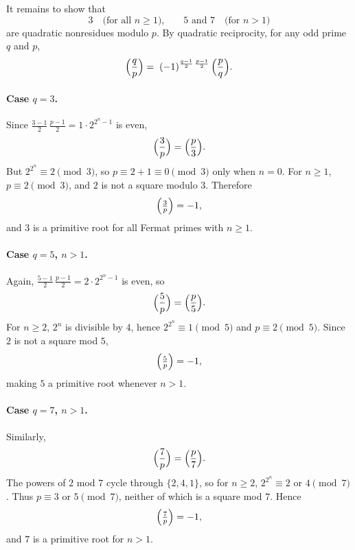 \begin{enumerate}
\begin{subanswer}
  It remains to show that
  \[
  3\quad\text{(for all \(n\ge1\)),}
  \qquad
  5\text{ and }7\quad\text{(for \(n>1\))}
  \]
  are quadratic nonresidues modulo \(p\).  By quadratic reciprocity,
  for any odd prime \(q\) and \(p\),
  \[
  \Bigl(\frac{q}{p}\Bigr)
  =\;
  (-1)^{\frac{q-1}{2}\,\frac{p-1}{2}}\,
  \Bigl(\frac{p}{q}\Bigr).
  \]

  \paragraph{Case \(q=3\).}
  Since \(\tfrac{3-1}{2}\,\tfrac{p-1}{2}=1\cdot2^{2^n-1}\) is even,
  \[
  \Bigl(\frac{3}{p}\Bigr)
  =\Bigl(\frac{p}{3}\Bigr).
  \]
  But \(2^{2^n}\equiv2\pmod3\), so \(p\equiv2+1\equiv0\pmod3\) only when \(n=0\).  For \(n\ge1\), \(p\equiv2\pmod3\), and \(2\) is not a square modulo \(3\).  Therefore
  \[
  \Bigl(\tfrac{3}{p}\Bigr)=-1,
  \]
  and \(3\) is a primitive root for all Fermat primes with \(n\ge1\).

  \paragraph{Case \(q=5\), \(n>1\).}
  Again,
  \(\tfrac{5-1}{2}\,\tfrac{p-1}{2}=2\cdot2^{2^n-1}\) is even, so
  \[
  \Bigl(\frac{5}{p}\Bigr)
  =\Bigl(\frac{p}{5}\Bigr).
  \]
  For \(n\ge2\), \(2^n\) is divisible by \(4\), hence \(2^{2^n}\equiv1\pmod5\) and \(p\equiv2\pmod5\).  Since \(2\) is not a square mod \(5\),
  \[
  \Bigl(\tfrac{5}{p}\Bigr)=-1,
  \]
  making \(5\) a primitive root whenever \(n>1\).

  \paragraph{Case \(q=7\), \(n>1\).}
  Similarly,
  \[
  \Bigl(\frac{7}{p}\Bigr)
  =\Bigl(\frac{p}{7}\Bigr).
  \]
  The powers of \(2\) mod \(7\) cycle through \(\{2,4,1\}\), so for \(n\ge2\), \(2^{2^n}\equiv2\) or \(4\pmod7\).  Thus \(p\equiv3\) or \(5\pmod7\), neither of which is a square mod \(7\).  Hence
  \[
  \Bigl(\tfrac{7}{p}\Bigr)=-1,
  \]
  and \(7\) is a primitive root for \(n>1\).
  \end{subanswer}
  




  




  














\end{enumerate}
